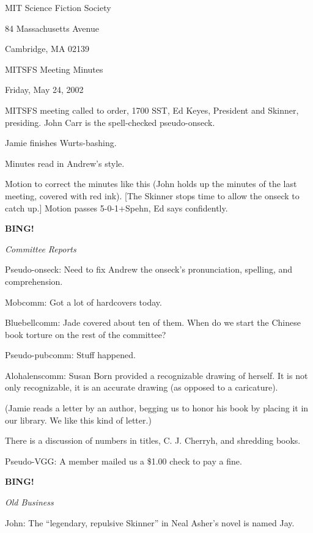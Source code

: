\documentclass[12pt]{article}
\newcommand{\bing}{{\bf BING!} }
\newcommand{\goto}[1]{\bing \vskip 12pt \centerline{{\em{#1}}}}
\begin{document}
\begin{center}

MIT Science Fiction Society 

84 Massachusetts Avenue

Cambridge, MA 02139

\vspace{12pt}

MITSFS Meeting Minutes 

Friday, May 24, 2002

\end{center}
 
\vspace{18pt}

\setlength{\parskip}{6pt}

\noindent
MITSFS meeting called to order, 1700 SST,
Ed Keyes, President and Skinner, presiding.
John Carr is the spell-checked pseudo-onseck.

Jamie finishes Wurts-bashing.

Minutes read in Andrew's style.

Motion to correct the minutes like this (John holds up the minutes
of the last meeting, covered with red ink).  [The Skinner stops time
to allow the onseck to catch up.]  Motion passes \hbox{5-0-1+Spehn},
Ed says confidently.

\goto{Committee Reports}

Pseudo-onseck: Need to fix Andrew the onseck's pronunciation,
spelling, and comprehension.

Mobcomm: Got a lot of hardcovers today.

Bluebellcomm: Jade covered about ten of them.  When do we start
the Chinese book torture on the rest of the committee?

Pseudo-pubcomm: Stuff happened.

Alohalenscomm: Susan Born provided a recognizable drawing of herself.
It is not only recognizable, it is an accurate drawing (as opposed to
a caricature).

(Jamie reads a letter by an author, begging us to honor his book by
placing it in our library.  We like this kind of letter.)

There is a discussion of numbers in titles, C. J. Cherryh, and
shredding books.

Pseudo-VGG: A member mailed us a \$1.00 check to pay a fine.

\goto{Old Business}

John: The ``legendary, repulsive Skinner'' in Neal Asher's novel is named Jay.
\end{document}
